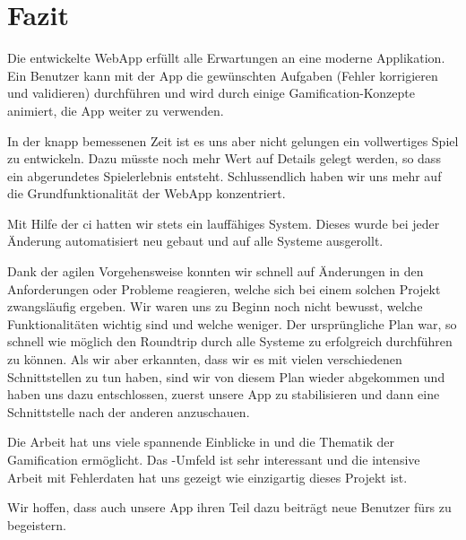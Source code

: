 \section{Fazit}
\label{fazit}
Die entwickelte \gls{WebApp} erfüllt alle Erwartungen an eine moderne Applikation.
Ein Benutzer kann mit der App die gewünschten Aufgaben (Fehler korrigieren und validieren) durchführen und wird durch einige Gamification-Konzepte animiert, die App weiter zu verwenden.

In der knapp bemessenen Zeit ist es uns aber nicht gelungen ein vollwertiges Spiel zu entwickeln.
Dazu müsste noch mehr Wert auf Details gelegt werden, so dass ein abgerundetes Spielerlebnis entsteht.
Schlussendlich haben wir uns mehr auf die Grundfunktionalität der \gls{WebApp} konzentriert.

Mit Hilfe der \gls{ci} hatten wir stets ein lauffähiges System.
Dieses wurde bei jeder Änderung automatisiert neu gebaut und auf alle Systeme ausgerollt.

Dank der agilen Vorgehensweise konnten wir schnell auf Änderungen in den Anforderungen oder Probleme reagieren, welche sich bei einem solchen Projekt zwangsläufig ergeben.
Wir waren uns zu Beginn noch nicht bewusst, welche Funktionalitäten wichtig sind und welche weniger.
Der ursprüngliche Plan war, so schnell wie möglich den Roundtrip durch alle Systeme zu erfolgreich durchführen zu können.
Als wir aber erkannten, dass wir es mit vielen verschiedenen Schnittstellen zu tun haben, sind wir von diesem Plan wieder abgekommen und haben uns dazu entschlossen, zuerst unsere App zu stabilisieren und dann eine Schnittstelle nach der anderen anzuschauen.

Die Arbeit hat uns viele spannende Einblicke in  und die Thematik der \gls{Gamification} ermöglicht.
Das -Umfeld ist sehr interessant und die intensive Arbeit mit Fehlerdaten hat uns gezeigt wie einzigartig dieses Projekt ist.

Wir hoffen, dass auch unsere App ihren Teil dazu beiträgt neue Benutzer fürs  zu begeistern.